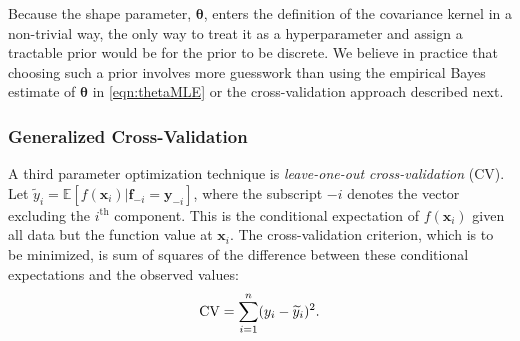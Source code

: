 \documentclass[twocolumn]{svjour3}          %
\newcommand{\bm}[1]{\boldsymbol{#1}}
\newcommand{\Ex}{\mathbb{E}}
\newcommand{\vtheta}{{\bm{\theta}}}
\newcommand{\vf}{\bm{f}}
\newcommand{\vx}{\bm{x}}
\newcommand{\vy}{\bm{y}}
\begin{document}
Because the shape parameter, $\vtheta$, enters the definition of the covariance kernel in a non-trivial way, the only way to treat it as a hyperparameter and assign a tractable prior would be for the prior to be discrete.  We believe in practice that choosing such a prior involves more guesswork than using the empirical Bayes estimate of $\vtheta$ in \eqref{eqn:thetaMLE} or the cross-validation approach described next.


\subsubsection{Generalized Cross-Validation} \label{sec:GCV}
A third parameter optimization technique is \emph{leave-one-out cross-validation} (CV).  Let $\widetilde{y}_i = \Ex[f(\vx_i ) | \vf_{-i} = \vy_{-i}]$, where the subscript $-i$ denotes the vector excluding the $i^{\text{th}}$ component.  This is the conditional expectation of $f(\vx_i )$ given all data but the function value at $\vx_i$.  The cross-validation criterion, which is to be minimized, is sum of squares of the difference between these conditional expectations and the observed values:
\begin{equation} \label{FJH:eq:CVA}
\textup{CV} = \sum_{i=1}^n (y_i - \widetilde{y}_i)^2.
\end{equation}
\end{document}
